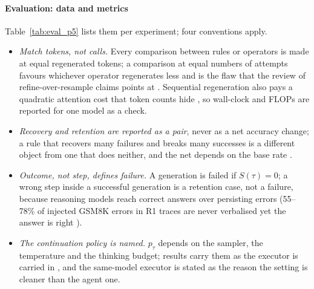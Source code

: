 \paragraph{Evaluation: data and metrics} Table~\ref{tab:eval_p5} lists them per experiment; four conventions apply.
\begin{itemize}[leftmargin=1.1em]
\item \emph{Match tokens, not calls.} Every comparison between rules or operators is made at equal regenerated tokens; a comparison at equal numbers of attempts favours whichever operator regenerates less and is the flaw that the review of refine-over-resample claims points at \cite{verma2026tryagain}. Sequential regeneration also pays a quadratic attention cost that token counts hide \cite{qin2025backtrack}, so wall-clock and FLOPs are reported for one model as a check.
\item \emph{Recovery and retention are reported as a pair}, never as a net accuracy change; a rule that recovers many failures and breaks many successes is a different object from one that does neither, and the net depends on the base rate \cite{zhang2026riskaware}.
\item \emph{Outcome, not step, defines failure.} A generation is failed if $S(\tau)=0$; a wrong step inside a successful generation is a retention case, not a failure, because reasoning models reach correct answers over persisting errors (55--78\% of injected GSM8K errors in R1 traces are never verbalised yet the answer is right \cite{phan2026critique}).
\item \emph{The continuation policy is named.} $p_\tau$ depends on the sampler, the temperature and the thinking budget; results carry them as the executor is carried in \citet{liao2026repairs}, and the same-model executor is stated as the reason the setting is cleaner than the agent one.
\end{itemize}

